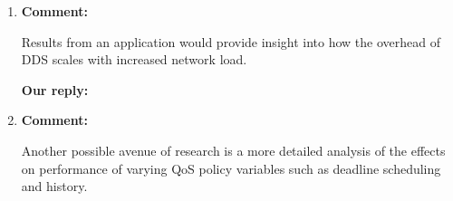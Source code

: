 \documentclass{article}
\begin{document}
\begin{enumerate}
\item \begin{flushleft}
    \textbf{Comment:}
  \end{flushleft}
  Results from an application would provide insight into how the overhead of DDS scales with increased network load.

  \begin{flushleft}
    \textbf{Our reply:}
  \end{flushleft}
  

\item \begin{flushleft}
    \textbf{Comment:}
  \end{flushleft}
  Another possible avenue of research is a more detailed analysis of the effects on performance of varying QoS policy variables such as deadline scheduling and history.


\end{enumerate}
\end{document}
